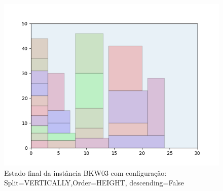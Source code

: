 \begin{figure}[H]
    \centering
    \caption[]{Estado final da instância BKW03 com configuração: Split=VERTICALLY,Order=HEIGHT, descending=False}
    \label{fig:bkw03-vertically-height-false}
    \includegraphics[scale=0.5]{output/figures/bkw/bkw03/vertically/height/false/00}
\end{figure}
